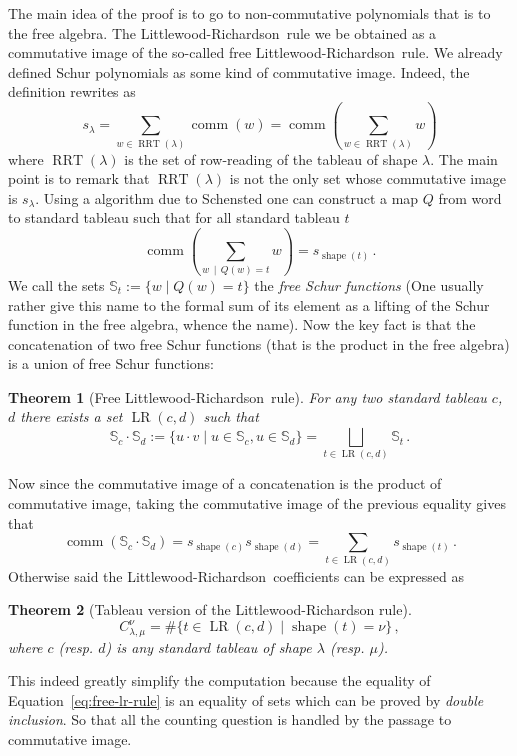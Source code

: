 \documentclass[12pt,a4paper]{article}
\newcommand{\LR}{Littlewood-Richardson\ }
\newcommand{\comm}{\operatorname{comm}}
\newcommand{\freeS}{{\mathbb S}}
\newcommand{\shape}{\operatorname{shape}}
\newtheorem{THEO}{Theorem}
\begin{document}
The main idea of the proof is to go to non-commutative polynomials that is to
the free algebra. The \LR rule we be obtained as a commutative image of the
so-called free \LR rule. We already defined Schur polynomials as some kind of
commutative image. Indeed, the definition rewrites as
\begin{equation}
  s_\lambda = \sum_{w \in \operatorname{RRT}(\lambda)}
  \comm(w) = \comm\left(\sum_{w \in \operatorname{RRT}(\lambda)} w\right)
\end{equation}
where $\operatorname{RRT}(\lambda)$ is the set of row-reading of the tableau
of shape $\lambda$. The main point is to remark that
$\operatorname{RRT}(\lambda)$ is not the only set whose commutative image is
$s_\lambda$. Using a algorithm due to Schensted one can construct a map $Q$
from word to standard tableau such that for all standard tableau $t$
\begin{equation}
  \comm\left(\sum_{w\, \mid\, Q(w)=t} w\right) = s_{\shape(t)}\,.
\end{equation}
We call the sets $\freeS_t := \{w \mid Q(w)=t\}$ the \emph{free Schur
  functions} (One usually rather give this name to the formal sum of its
element as a lifting of the Schur function in the free algebra, whence the
name).  Now the key fact is that the concatenation of two free Schur functions
(that is the product in the free algebra) is a union of free Schur functions:
\begin{THEO}[Free \LR rule]\label{theo:free-LR_rule}
  For any two standard tableau $c$, $d$ there exists a set $\operatorname{LR}(c,
  d)$ such that
  \begin{equation}
    \label{eq:free-lr-rule}
    \freeS_c\cdot\freeS_d := \{ u\cdot v \mid u\in \freeS_c, u\in \freeS_d \} =
    \bigsqcup_{t\in\operatorname{LR}(c, d)} \freeS_t\,.
  \end{equation}
\end{THEO}
Now since the commutative image of a concatenation is the product of
commutative image, taking the commutative image of the previous equality gives that
\begin{equation}
  \comm(\freeS_c\cdot\freeS_d) = s_{\shape(c)}s_{\shape(d)} =
  \sum_{t\in\operatorname{LR}(c, d)} s_{\shape(t)}\,.
\end{equation}
Otherwise said the \LR coefficients can be expressed as
\begin{THEO}[Tableau version of the Littlewood-Richardson rule]
  \begin{equation}
    C_{\lambda,\mu}^{\nu} = \#\{t\in\operatorname{LR}(c, d) \mid \shape(t) = \nu\}\,,
  \end{equation}
  where $c$ (resp. $d$) is any standard tableau of shape $\lambda$
  (resp. $\mu$).
\end{THEO}
This indeed greatly simplify the computation because the equality of
Equation~\ref{eq:free-lr-rule} is an equality of sets which can be proved by
\emph{double inclusion}. So that all the counting question is handled by the passage
to commutative image.
\end{document}
